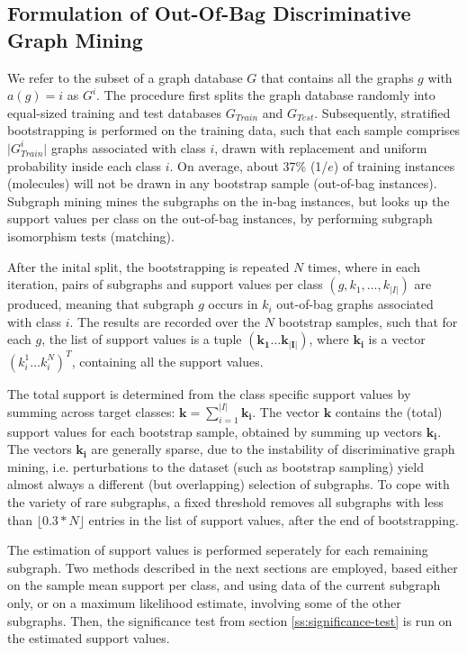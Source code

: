 \documentclass{article}
\begin{document}
\subsection{Formulation of Out-Of-Bag Discriminative Graph Mining}
\label{ss:oob-dgm}
We refer to the subset of a graph database $G$ that contains all the graphs $g$
with $a(g)=i$ as $G^i$.  The procedure first splits the graph database randomly
into equal-sized training and test databases $G_{Train}$ and $G_{Test}$.
Subsequently, stratified bootstrapping is performed on the training data, such
that each sample comprises $\vert G_{Train}^i\vert$ graphs associated with
class $i$, drawn with replacement and uniform probability inside each
class $i$.  On average, about 37\% (1/$e$) of training instances (molecules)
will not be drawn in any bootstrap sample (out-of-bag instances). Subgraph mining mines
the subgraphs on the in-bag instances, but looks up the support values per
class on the out-of-bag instances, by performing subgraph isomorphism tests
(matching).

After the inital split, the bootstrapping is repeated $N$ times, where in each
iteration, pairs of subgraphs and support values per class
$(g,k_1,\ldots,k_{\vert I\vert})$ are produced, meaning that subgraph $g$
occurs in $k_i$ out-of-bag graphs associated with class $i$. The results are
recorded over the $N$ bootstrap samples, such that for each $g$, the list of
support values is a tuple $(\mathbf{k_1}\ldots\mathbf{k_{\vert I\vert}})$,
where $\mathbf{k_i}$ is a vector $(k_i^1\ldots k_i^N)^T$, containing all the
support values.  

The total support is determined from the class specific support values by
summing across target classes: $\mathbf{k}=\sum_{i=1}^{\vert I\vert}
\mathbf{k_i}$.  The vector $\mathbf{k}$ contains the (total) support values for
each bootstrap sample, obtained by summing up vectors $\mathbf{k_i}$.  The
vectors $\mathbf{k_i}$ are generally sparse, due to the instability of
discriminative graph mining, i.e. perturbations to the dataset (such as
bootstrap sampling) yield almost always a different (but overlapping) selection
of subgraphs. To cope with the variety of rare subgraphs, a fixed threshold
removes all subgraphs with less than $\lfloor0.3*N\rfloor$ entries in the list
of support values, after the end of bootstrapping.

The estimation of support values is performed seperately for each remaining
subgraph. Two methods described in the next sections are employed, based either
on the sample mean support per class, and using data of the current subgraph
only, or on a maximum likelihood estimate, involving some of the other
subgraphs. Then, the significance test from section \ref{ss:significance-test}
is run on the estimated support values. 
\end{document}
